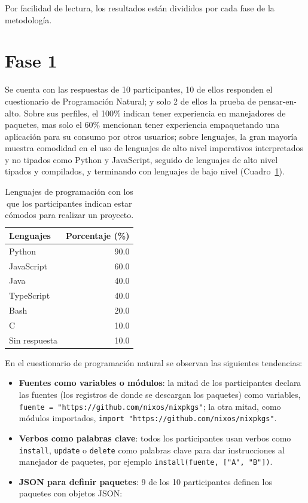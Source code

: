 Por facilidad de lectura, los resultados están divididos por cada fase de la metodología.

\section{Fase 1}

Se cuenta con las respuestas de 10 participantes, 10 de ellos responden el cuestionario de Programación Natural; y solo 2 de ellos la prueba de pensar-en-alto. Sobre sus perfiles, el 100\% indican tener experiencia en manejadores de paquetes, mas solo el 60\% mencionan tener experiencia empaquetando una aplicación para su consumo por otros usuarios; sobre lenguajes, la gran mayoría muestra comodidad en el uso de lenguajes de alto nivel imperativos interpretados y no tipados como Python y JavaScript, seguido de lenguajes de alto nivel tipados y compilados, y terminando con lenguajes de bajo nivel (Cuadro~\ref{cuadro3}).

\begin{table}[htbp]
\centering
\setlength{\tabcolsep}{4pt}
\begin{tabular}{|l|r|}
\hline
\textbf{Lenguajes} & \textbf{Porcentaje (\%)} \\
\hline
Python & 90.0 \\
\hline
JavaScript & 60.0 \\
\hline
Java & 40.0 \\
\hline
TypeScript & 40.0 \\
\hline
Bash & 20.0 \\
\hline
C & 10.0 \\
\hline
Sin respuesta & 10.0 \\
\hline
\end{tabular}
\caption{Lenguajes de programación con los que los participantes indican estar cómodos para realizar un proyecto.}
\label{cuadro3}
\end{table}

En el cuestionario de programación natural se observan las siguientes tendencias:

\begin{itemize}
\item \textbf{Fuentes como variables o módulos}: la mitad de los participantes declara las fuentes (los registros de donde se descargan los paquetes) como variables, \texttt{fuente = "https:/\allowbreak{}/\allowbreak{}github.\allowbreak{}com/\allowbreak{}nixos/\allowbreak{}nixpkgs"}; la otra mitad, como módulos importados, \texttt{import "https:/\allowbreak{}/\allowbreak{}github.\allowbreak{}com/\allowbreak{}nixos/\allowbreak{}nixpkgs"}.
\item \textbf{Verbos como palabras clave}: todos los participantes usan verbos como \texttt{install}, \texttt{update} o \texttt{delete} como palabras clave para dar instrucciones al manejador de paquetes, por ejemplo \texttt{install(fuente, ["A", "B"])}.
\item \textbf{JSON para definir paquetes}: 9 de los 10 participantes definen los paquetes con objetos JSON:
\end{itemize}

